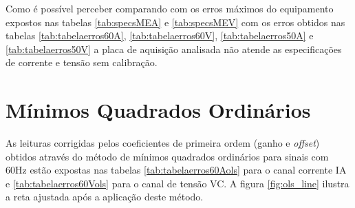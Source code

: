 \begin{table}[htb]
\end{table}

Como é possível perceber comparando com os erros máximos do equipamento expostos nas tabelas \ref{tab:specsMEA} e \ref{tab:specsMEV} com os erros obtidos nas tabelas \ref{tab:tabelaerros60A}, \ref{tab:tabelaerros60V}, \ref{tab:tabelaerros50A} e \ref{tab:tabelaerros50V} a placa de aquisição analisada não atende as especificações de corrente e tensão sem calibração.

\newpage

\section{Mínimos Quadrados Ordinários}

As leituras corrigidas pelos coeficientes de primeira ordem (ganho e \textit{offset}) obtidos através do método de mínimos quadrados ordinários para sinais com 60Hz estão expostas nas tabelas \ref{tab:tabelaerros60Aols} para o canal corrente IA e \ref{tab:tabelaerros60Vols} para o canal de tensão VC. A figura \ref{fig:ols_line} ilustra a reta ajustada após a aplicação deste método.


